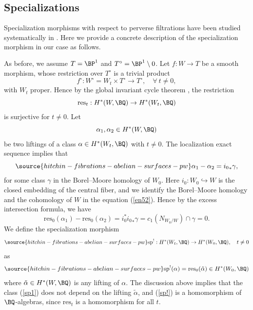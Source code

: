 \subsection{Specializations}\label{section4.3} Specialization morphisms with respect to perverse filtrations have been studied systematically in \cite{dCM,sp}. Here we provide a concrete description of the specialization morphism in our case as follows.

As before, we assume $T = \BP^1$ and $T^\circ = \BP^1 \setminus 0$. Let $f: W \to T$ be a smooth morphism, whose restriction over $T^\circ$ is a trivial product
\[
f^\circ: W^\circ = W_t \times T^\circ \rightarrow T^\circ, \quad \forall~ t\neq 0,
\]
with $W_t$ proper.
Hence by the global invariant cycle theorem \cite[Theorem 1.7.1]{dCM1}, the restriction
\[
\mathrm{res}_t:  H^*(W, \BQ) \to H^*(W_t, \BQ)
\]
is surjective for $t \neq 0$. Let
\[
\alpha_1, \alpha_2 \in H^*(W, \BQ)
\]
be two liftings of a class $\alpha \in H^*(W_t, \BQ)$ with $t\neq 0$. The localization exact sequence implies that
\begin{equation}\label{en52}
\source{hitchin-fibrations-abelian-surfaces-pw}
\alpha_1 - \alpha_2 = {i_0}_* \gamma,
\end{equation}
for some class $\gamma$
 in the Borel--Moore homology of $W_0$.  Here $i_0: W_0 \hookrightarrow W$ is the closed embedding of the central fiber, and we identify the Borel--Moore homology and the cohomology of $W$ in the equation (\ref{en52}). Hence by the excess intersection formula, we have
\[
\mathrm{res}_0(\alpha_1) - \mathrm{res}_0(\alpha_2) = i_0^*{i_0}_* \gamma = c_1(N_{W_0/W})\cap \gamma =0.
\]
We define the specialization morphism
\begin{equation}\label{sp!}
\source{hitchin-fibrations-abelian-surfaces-pw}
\mathrm{sp}^!: H^*(W_t, \BQ) \rightarrow H^*(W_0, \BQ), \quad t\neq 0
\end{equation}
as
\begin{equation}\label{sp1}
\source{hitchin-fibrations-abelian-surfaces-pw}
\mathrm{sp^!}(\alpha) = \mathrm{res}_0(\tilde{\alpha}) \in H^*(W_0, \BQ)
\end{equation}
where $\tilde{\alpha} \in H^*(W, \BQ)$ is any lifting of $\alpha$. The discussion above implies that the class (\ref{sp1}) does not depend on the lifting $\tilde{\alpha}$, and (\ref{sp!}) is a homomorphism of $\BQ$-algebras,
since $\mathrm{res}_t$ is a homomorphism for all $t$.


